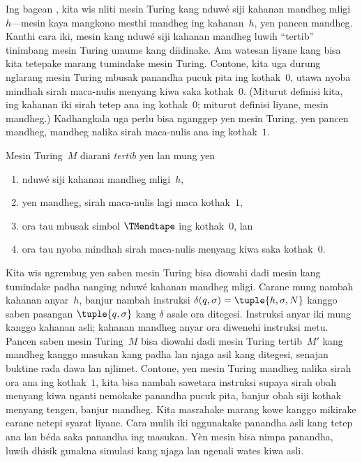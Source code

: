 \documentclass[../../../include/open-logic-section]{subfiles}
\begin{document}

\begin{explain}
Ing bagean , kita wis nliti mesin Turing kang nduwé
siji kahanan mandheg mligi~$h$---mesin kaya mangkono mesthi
mandheg ing kahanan~$h$, yen pancen mandheg. Kanthi cara iki,
mesin kang nduwé siji kahanan mandheg luwih ``tertib''
tinimbang mesin Turing umume kang diidinake. Ana watesan
liyane kang bisa kita tetepake marang tumindake mesin Turing.
Contone, kita uga durung nglarang mesin Turing mbusak
panandha pucuk pita ing kothak~$0$, utawa nyoba mindhah
sirah maca-nulis menyang kiwa saka kothak~$0$. (Miturut
definisi kita, ing kahanan iki sirah tetep ana ing kothak~$0$;
miturut definisi liyane, mesin mandheg.) Kadhangkala uga
perlu bisa nganggep yen mesin Turing, yen pancen mandheg,
mandheg nalika sirah maca-nulis ana ing kothak~$1$.
\end{explain}

\begin{defn}
Mesin Turing~$M$ diarani \emph{tertib} yen lan mung yen
\begin{enumerate}
    \item nduwé siji kahanan mandheg mligi~$h$,
    \item yen mandheg, sirah maca-nulis lagi maca kothak~$1$,
    \item ora tau mbusak simbol $\TMendtape$ ing kothak~$0$, lan
    \item ora tau nyoba mindhah sirah maca-nulis menyang kiwa saka kothak~$0$.
\end{enumerate}
\end{defn}

\begin{explain}
Kita wis ngrembug yen saben mesin Turing bisa diowahi dadi
mesin kang tumindake padha nanging nduwé kahanan mandheg
mligi. Carane mung nambah kahanan anyar~$h$, banjur nambah
instruksi $\delta(q, \sigma) = \tuple{h, \sigma, N}$ kanggo
saben pasangan $\tuple{q,\sigma}$ kang $\delta$ asale
ora ditegesi. Instruksi anyar iki mung kanggo kahanan asli; kahanan mandheg anyar ora diwenehi instruksi metu. Pancen saben mesin Turing~$M$ bisa diowahi
dadi mesin Turing tertib~$M'$ kang mandheg kanggo masukan
kang padha lan njaga asil kang ditegesi, senajan
buktine rada dawa lan njlimet. Contone, yen mesin Turing
mandheg nalika sirah ora ana ing kothak~$1$, kita bisa
nambah sawetara instruksi supaya sirah obah menyang kiwa
nganti nemokake panandha pucuk pita, banjur obah siji
kothak menyang tengen, banjur mandheg. Kita masrahake
marang kowe kanggo mikirake carane netepi syarat liyane. Cara mulih iki nggunakake panandha asli kang tetep ana lan béda saka panandha ing masukan. Yèn mesin bisa nimpa panandha, luwih dhisik gunakna simulasi kang njaga lan ngenali wates kiwa asli.
\end{explain}
\end{document}
